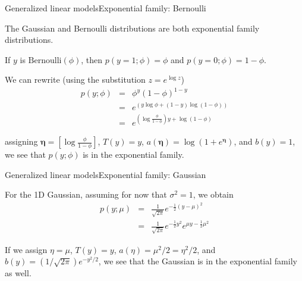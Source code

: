 \documentclass{beamer}
\renewcommand{\vec}[1]{\boldsymbol{#1}}
\begin{document}
\begin{frame}{Generalized linear models}{Exponential family: Bernoulli}

  The Gaussian and Bernoulli distributions are both exponential family distributions.

  \medskip

  If $y$ is $\textrm{Bernoulli}(\phi)$, then $p(y = 1 ; \phi) = \phi$ and
  $p(y=0 ; \phi) = 1-\phi$.

  \medskip

  We can rewrite (using the substitution $z = e^{\log z}$)
  \begin{eqnarray}
    p(y ; \phi) & = & \phi^y (1-\phi)^{1-y} \nonumber \\
    & = & e^{(y \log \phi + (1-y)\log(1-\phi))} \nonumber \\
    & = & e^{(\log{\frac{\phi}{1-\phi}})y + \log{(1-\phi)}} \nonumber
  \end{eqnarray}

  assigning $\vec{\eta}=[\log{\frac{\phi}{1-\phi}}]$, $T(y)=y$,
  $a(\vec{\eta}) = \log(1+e^{\vec{\eta}})$, and $b(y)=1$, we see that
  $p(y ; \phi)$ is in the exponential family.
  
\end{frame}


\begin{frame}{Generalized linear models}{Exponential family: Gaussian}

  For the 1D Gaussian, assuming for now that $\sigma^2 = 1$, we obtain
  \begin{eqnarray}
    p(y ; \mu) & = & \frac{1}{\sqrt{2\pi}}e^{-\frac{1}{2}(y-\mu)^2} \nonumber \\
    & = & \frac{1}{\sqrt{2\pi}}e^{-\frac{1}{2}y^2}e^{\mu y - \frac{1}{2}\mu^2} \nonumber
  \end{eqnarray}

  If we assign $\eta = \mu$, $T(y) = y$, $a(\eta) = \mu^2/2 =
  \eta^2/2$, and $b(y) = (1/\sqrt{2\pi})e^{-y^2/2}$, we see that the
  Gaussian is in the exponential family as well.
  
\end{frame}
\end{document}
